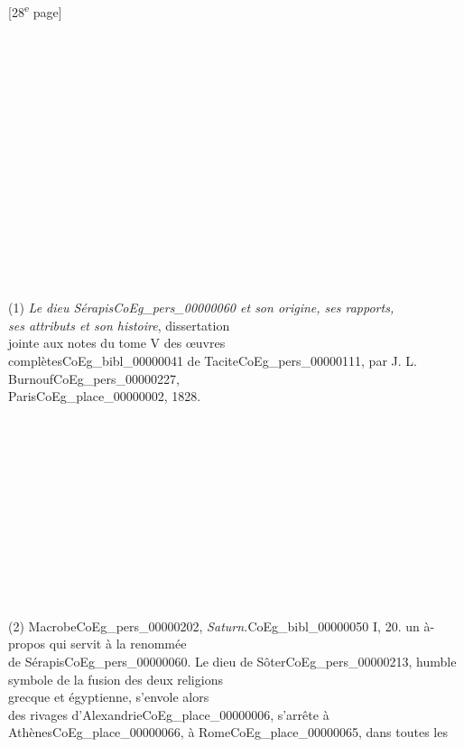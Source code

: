 \documentclass{book}
\begin{document}
{{\footnotesize\begin{center} {[28\textsuperscript{e} page]}\end{center}}

\begin{paracol}{2}
\noindent \\
\\
\\
\\
\\
\\
\\
\\
\\
\\
\\
\\
\\
\\
\\
(1) \textit{Le dieu Sérapis\gls{CoEg_pers_00000060} et son origine, ses rapports,\\
ses attributs et son histoire}, dissertation\\
jointe aux notes du tome V des œuvres\\
complètes\gls{CoEg_bibl_00000041} de Tacite\gls{CoEg_pers_00000111}, par J. L. Burnouf\gls{CoEg_pers_00000227},\\
Paris\gls{CoEg_place_00000002}, 1828.\\
\\
\\
\\
\\
\\
\\
\\
\\
\\
\\
\\
\\
(2) Macrobe\gls{CoEg_pers_00000202}, \textit{Saturn.}\gls{CoEg_bibl_00000050} I, 20.
\switchcolumn
\noindent un à-propos qui servit à la renommée\\
de Sérapis\gls{CoEg_pers_00000060}. Le dieu de Sôter\gls{CoEg_pers_00000213}, humble\\
symbole de la fusion des deux religions\\
grecque et égyptienne, s’envole alors\\
des rivages d’Alexandrie\gls{CoEg_place_00000006}, s’arrête à\\
Athènes\gls{CoEg_place_00000066}, à Rome\gls{CoEg_place_00000065}, dans toutes les\\

\end{paracol}}
\end{document}
